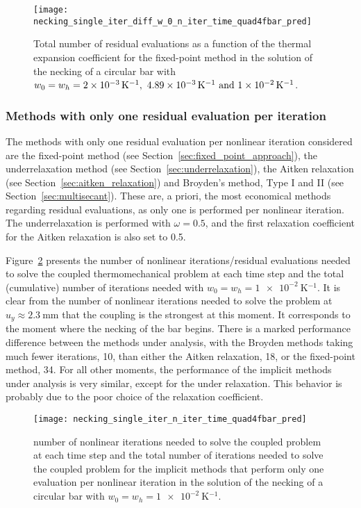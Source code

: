 \begin{figure}[htbp]
 \centering
 \texttt{[image: necking\_single\_iter\_diff\_w\_0\_n\_iter\_time\_quad4fbar\_pred]}
 \caption{Total number of residual evaluations as a function of the thermal expansion coefficient for the fixed-point method in the solution of the necking of a circular bar with \(w_0=w_h=\SIlist{2e-3; 4.89e-3; 1e-2}{\kelvin^{-1}}\).}
\label{fig:necking_single_iter_diff_w_0_n_iter_time_quad4fbar_pred}
\end{figure}

\subsubsection{Methods with only one residual evaluation per iteration}

The methods with only one residual evaluation per nonlinear iteration considered are the fixed-point method (see Section~\ref{sec:fixed_point_approach}), the underrelaxation method (see Section~\ref{sec:underrelaxation}), the Aitken relaxation (see Section~\ref{sec:aitken_relaxation}) and Broyden's method, Type I and II (see Section~\ref{sec:multisecant}).
These are, a priori, the most economical methods regarding residual evaluations, as only one is performed per nonlinear iteration.
The underrelaxation is performed with \(\omega = 0.5\), and the first relaxation coefficient for the Aitken relaxation is also set to 0.5.

Figure~\ref{fig:necking_single_iter_n_iter_time_quad4fbar_pred} presents the number of nonlinear iterations/residual evaluations needed to solve the coupled thermomechanical problem at each time step and the total (cumulative) number of iterations needed with \(w_0=w_h=\SI{1e-2}{\kelvin^{-1}}\).
It is clear from the number of nonlinear iterations needed to solve the problem at \(u_y\approx\SI{2.3}{\milli\meter}\) that the coupling is the strongest at this moment.
It corresponds to the moment where the necking of the bar begins.
There is a marked performance difference between the methods under analysis, with the Broyden methods taking much fewer iterations, 10, than either the Aitken relaxation, 18, or the fixed-point method, 34.
For all other moments, the performance of the implicit methods under analysis is very similar, except for the under relaxation.
This behavior is probably due to the poor choice of the relaxation coefficient.

\begin{figure}[htbp]
 \centering
 \texttt{[image: necking\_single\_iter\_n\_iter\_time\_quad4fbar\_pred]}
 \caption{number of nonlinear iterations needed to solve the coupled problem at each time step and the total number of iterations needed to solve the coupled problem for the implicit methods that perform only one evaluation per nonlinear iteration in the solution of the necking of a circular bar with \(w_0=w_h=\SI{1e-2}{\kelvin^{-1}}\).}
\label{fig:necking_single_iter_n_iter_time_quad4fbar_pred}
\end{figure}

